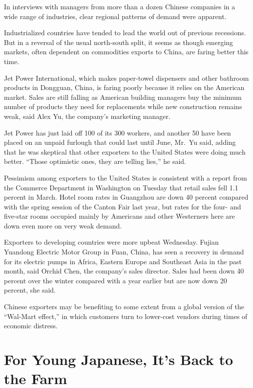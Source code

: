 \documentclass[12pt,a4paper,onecolumn]{article}
\begin{document}
In interviews with managers from more than a dozen Chinese companies in a wide range of industries,
clear regional patterns of demand were apparent.

Industrialized countries have tended to lead the world out of previous recessions. But in a reversal
of the usual north-south split, it seems as though emerging markets, often dependent on commodities
exports to China, are faring better this time.

Jet Power International, which makes paper-towel dispensers and other bathroom products in Dongguan,
China, is faring poorly because it relies on the American market. Sales are still falling as
American building managers buy the minimum number of products they need for replacements while new
construction remains weak, said Alex Yu, the company's marketing manager.

Jet Power has just laid off 100 of its 300 workers, and another 50 have been placed on an unpaid
furlough that could last until June, Mr.~Yu said, adding that he was skeptical that other exporters
to the United States were doing much better. ``Those optimistic ones, they are telling lies,'' he
said.

Pessimism among exporters to the United States is consistent with a report from the Commerce
Department in Washington on Tuesday that retail sales fell 1.1 percent in March. Hotel room rates in
Guangzhou are down 40 percent compared with the spring session of the Canton Fair last year, but
rates for the four- and five-star rooms occupied mainly by Americans and other Westerners here are
down even more on very weak demand.

Exporters to developing countries were more upbeat Wednesday. Fujian Yuandong Electric Motor Group
in Fuan, China, has seen a recovery in demand for its electric pumps in Africa, Eastern Europe and
Southeast Asia in the past month, said Orchid Chen, the company's sales director. Sales had been
down 40 percent over the winter compared with a year earlier but are now down 20 percent, she said.

Chinese exporters may be benefiting to some extent from a global version of the ``Wal-Mart effect,''
in which customers turn to lower-cost vendors during times of economic distress.

\section{For Young Japanese, It's Back to the Farm}
\end{document}
